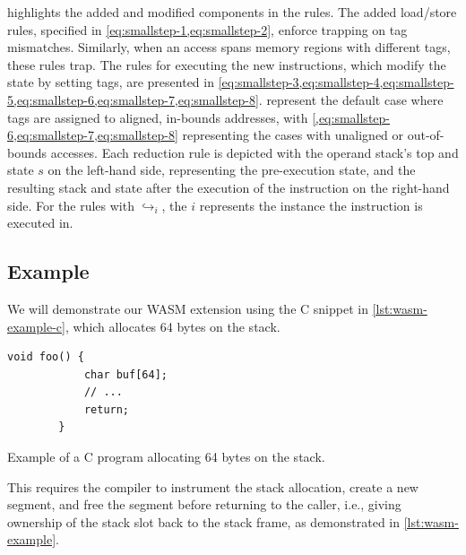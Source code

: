 \noindent
{} highlights the added and modified components in the rules.
The added load/store rules, specified in \cref{eq:smallstep-1,eq:smallstep-2}, enforce trapping on tag mismatches.
Similarly, when an access spans memory regions with different tags, these rules trap.
The rules for executing the new instructions, which modify the state by setting tags, are presented in \cref{eq:smallstep-3,eq:smallstep-4,eq:smallstep-5,eq:smallstep-6,eq:smallstep-7,eq:smallstep-8}.
 represent the default case where tags are assigned to aligned, in-bounds addresses, with \cref{,eq:smallstep-6,eq:smallstep-7,eq:smallstep-8} representing the cases with unaligned or out-of-bounds accesses.
Each reduction rule is depicted with the operand stack's top and state $s$ on the left-hand side, representing the pre-execution state, and the resulting stack and state after the execution of the instruction on the right-hand side.
For the rules with $\hookrightarrow_i$, the $i$ represents the instance the instruction is executed in.

\subsection{Example}
\label{subsec:example}

We will demonstrate our \ac{WASM} extension using the C snippet in \cref{lst:wasm-example-c}, which allocates 64 bytes on the stack.

\begin{lstfloat}
    \begin{lstlisting}[frame=h,style=customc,
        label={lst:wasm-example-c-inner}]
        void foo() {
            char buf[64];
            // ...
            return;
        }
    \end{lstlisting}
    \caption{Example of a C program allocating 64 bytes on the stack.}
    \label{lst:wasm-example-c}
\end{lstfloat}

\noindent
This requires the compiler to instrument the stack allocation, create a new segment, and free the segment before returning to the caller, i.e., giving ownership of the stack slot back to the stack frame, as demonstrated in \cref{lst:wasm-example}.

